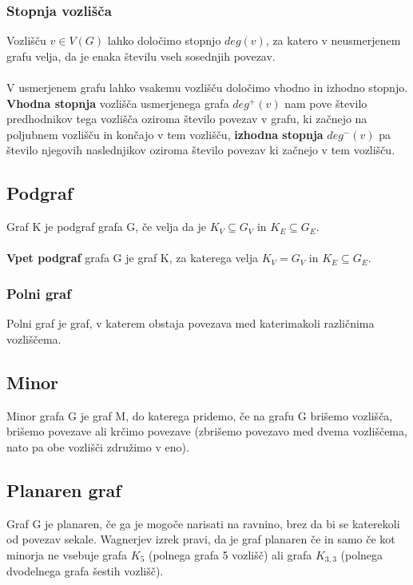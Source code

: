 \documentclass[11pt]{article}
\begin{document}
\subsubsection{Stopnja vozlišča}

Vozlišču $v \in V(G)$ lahko določimo stopnjo $deg(v)$, za katero v neusmerjenem grafu velja, da je enaka številu vseh sosednjih povezav.
\\ \\
V usmerjenem grafu lahko vsakemu vozlišču določimo vhodno in izhodno stopnjo. \textbf{Vhodna stopnja} vozlišča usmerjenega grafa $deg^+(v)$ nam pove število predhodnikov tega vozlišča oziroma število povezav v grafu, ki začnejo na poljubnem vozlišču in končajo v tem vozlišču, \textbf{izhodna stopnja} $deg^-(v)$ pa število njegovih naslednjikov oziroma število povezav ki začnejo v tem vozlišču.

\subsection{Podgraf}

Graf K je podgraf grafa G, če velja da je $K_V \subseteq G_V$ in $K_E \subseteq G_E$. 
\\ \\
\textbf{Vpet podgraf} grafa G je graf K, za katerega velja $K_V = G_V$ in $K_E \subseteq G_E$.

\subsubsection{Polni graf}

Polni graf je graf, v katerem obstaja povezava med katerimakoli različnima vozliščema.

\subsection{Minor}

Minor grafa G je graf M, do katerega pridemo, če na grafu G brišemo vozlišča, brišemo povezave ali krčimo povezave (zbrišemo povezavo med dvema vozliščema, nato pa obe vozlišči združimo v eno).

\subsection{Planaren graf}

Graf G je planaren, če ga je mogoče narisati na ravnino, brez da bi se katerekoli od povezav sekale. Wagnerjev izrek pravi, da je graf planaren če in samo če kot minorja ne vsebuje grafa $K_5$ (polnega grafa 5 vozlišč) ali grafa $K_{3, 3}$ (polnega dvodelnega grafa šestih vozlišč).
\end{document}
